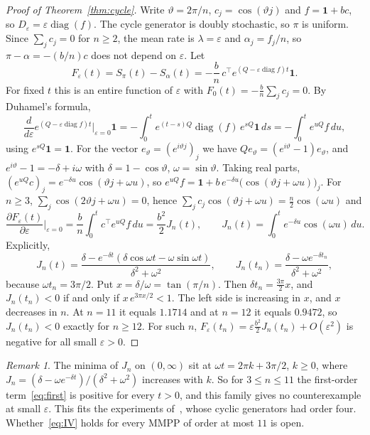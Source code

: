 \documentclass[11pt]{amsart}
\theoremstyle{remark}
\newtheorem{remark}[theorem]{Remark}
\newcommand{\one}{\mathbf 1}
\begin{document}
\begin{proof}[Proof of Theorem~\ref{thm:cycle}]
Write $\vartheta=2\pi/n$, $c_j=\cos(\vartheta j)$ and $f=\one+bc$, so $D_\varepsilon=\varepsilon\operatorname{diag}(f)$. The cycle generator is doubly stochastic, so $\pi$ is uniform. Since $\sum_jc_j=0$ for $n\ge2$, the mean rate is $\lambda=\varepsilon$ and $\alpha_j=f_j/n$, so $\pi-\alpha=-(b/n)c$ does not depend on $\varepsilon$. Let
\[
F_\varepsilon(t)=S_\pi(t)-S_\alpha(t)=-\frac bn\,c^{\top}e^{(Q-\varepsilon\operatorname{diag}f)t}\one .
\]
For fixed $t$ this is an entire function of $\varepsilon$ with $F_0(t)=-\frac bn\sum_jc_j=0$. By Duhamel's formula,
\[
\frac{d}{d\varepsilon}e^{(Q-\varepsilon\operatorname{diag}f)t}\Big|_{\varepsilon=0}\one=-\int_0^te^{(t-s)Q}\operatorname{diag}(f)\,e^{sQ}\one\,ds=-\int_0^te^{uQ}f\,du,
\]
using $e^{sQ}\one=\one$. For the vector $e_\vartheta=(e^{i\vartheta j})_j$ we have $Qe_\vartheta=(e^{i\vartheta}-1)e_\vartheta$, and $e^{i\vartheta}-1=-\delta+i\omega$ with $\delta=1-\cos\vartheta$, $\omega=\sin\vartheta$. Taking real parts, $(e^{uQ}c)_j=e^{-\delta u}\cos(\vartheta j+\omega u)$, so $e^{uQ}f=\one+b\,e^{-\delta u}\bigl(\cos(\vartheta j+\omega u)\bigr)_j$. For $n\ge3$, $\sum_j\cos(2\vartheta j+\omega u)=0$, hence $\sum_jc_j\cos(\vartheta j+\omega u)=\frac n2\cos(\omega u)$ and
\begin{equation}\label{eq:first}
\frac{\partial F_\varepsilon(t)}{\partial\varepsilon}\Big|_{\varepsilon=0}=\frac bn\int_0^tc^{\top}e^{uQ}f\,du=\frac{b^2}2J_n(t),\qquad J_n(t)=\int_0^te^{-\delta u}\cos(\omega u)\,du .
\end{equation}
Explicitly,
\[
J_n(t)=\frac{\delta-e^{-\delta t}(\delta\cos\omega t-\omega\sin\omega t)}{\delta^2+\omega^2},\qquad J_n(t_n)=\frac{\delta-\omega e^{-\delta t_n}}{\delta^2+\omega^2},
\]
because $\omega t_n=3\pi/2$. Put $x=\delta/\omega=\tan(\pi/n)$. Then $\delta t_n=\frac{3\pi}2x$, and $J_n(t_n)<0$ if and only if $x\,e^{3\pi x/2}<1$. The left side is increasing in $x$, and $x$ decreases in $n$. At $n=11$ it equals $1.1714$ and at $n=12$ it equals $0.9472$, so $J_n(t_n)<0$ exactly for $n\ge12$. For such $n$, $F_\varepsilon(t_n)=\varepsilon\frac{b^2}{2}J_n(t_n)+O(\varepsilon^2)$ is negative for all small $\varepsilon>0$.
\end{proof}

\begin{remark}\label{rem:small}
The minima of $J_n$ on $(0,\infty)$ sit at $\omega t=2\pi k+3\pi/2$, $k\ge0$, where $J_n=(\delta-\omega e^{-\delta t})/(\delta^2+\omega^2)$ increases with $k$. So for $3\le n\le11$ the first-order term~\eqref{eq:first} is positive for every $t>0$, and this family gives no counterexample at small $\varepsilon$. This fits the experiments of~\cite{AN}, whose cyclic generators had order four. Whether~\eqref{eq:IV} holds for every MMPP of order at most $11$ is open.
\end{remark}
\end{document}
